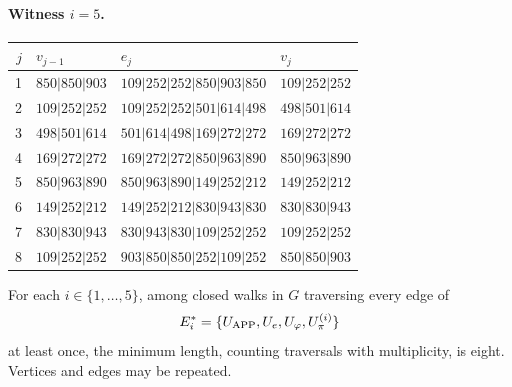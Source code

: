 \paragraph{Witness \(i=5\).}
\begin{center}
\small
\begin{tabular}{rlll}
\hline
\(j\)&\(v_{j-1}\)&\(e_j\)&\(v_j\)\\
\hline
1&\(850|850|903\)&\(109|252|252|850|903|850\)&\(109|252|252\)\\
2&\(109|252|252\)&\(109|252|252|501|614|498\)&\(498|501|614\)\\
3&\(498|501|614\)&\(501|614|498|169|272|272\)&\(169|272|272\)\\
4&\(169|272|272\)&\(169|272|272|850|963|890\)&\(850|963|890\)\\
5&\(850|963|890\)&\(850|963|890|149|252|212\)&\(149|252|212\)\\
6&\(149|252|212\)&\(149|252|212|830|943|830\)&\(830|830|943\)\\
7&\(830|830|943\)&\(830|943|830|109|252|252\)&\(109|252|252\)\\
8&\(109|252|252\)&\(903|850|850|252|109|252\)&\(850|850|903\)\\
\hline
\end{tabular}
\end{center}

\begin{theorem}
\label{regcl27:minimalidad}
For each \(i\in\{1,\ldots,5\}\), among closed walks in \(G\)
traversing every edge of
\[
 E_i^*=\{U_{\rm APP},U_e,U_\varphi,U_\pi^{(i)}\}
\]
at least once, the minimum length, counting traversals with multiplicity,
is eight. Vertices and edges may be repeated.
\end{theorem}

